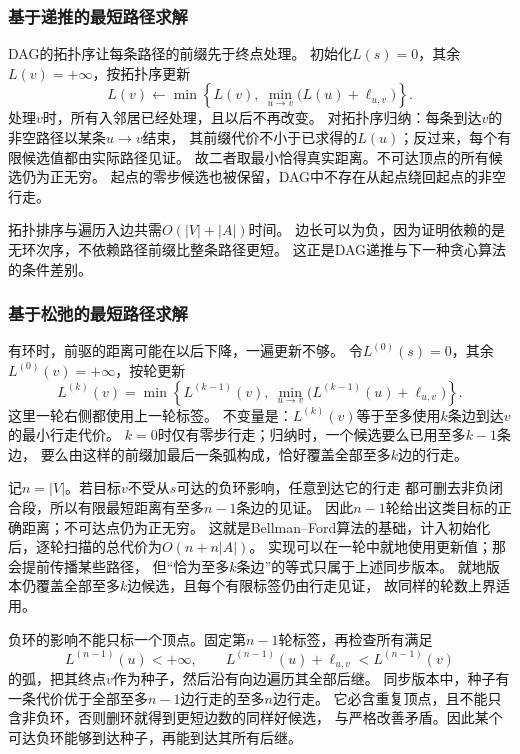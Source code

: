 \subsubsection{基于递推的最短路径求解}

DAG的拓扑序让每条路径的前缀先于终点处理。
初始化\(L(s)=0\)，其余\(L(v)=+\infty\)，按拓扑序更新
\[
  L(v)\leftarrow
  \min\left\{L(v),\ \min_{u\to v}\bigl(L(u)+\ell_{u,v}\bigr)\right\}.
\]
处理\(v\)时，所有入邻居已经处理，且以后不再改变。
对拓扑序归纳：每条到达\(v\)的非空路径以某条\(u\to v\)结束，
其前缀代价不小于已求得的\(L(u)\)；反过来，每个有限候选值都由实际路径见证。
故二者取最小恰得真实距离。不可达顶点的所有候选仍为正无穷。
起点的零步候选也被保留，DAG中不存在从起点绕回起点的非空行走。

拓扑排序与遍历入边共需\(O(|V|+|A|)\)时间。
边长可以为负，因为证明依赖的是无环次序，不依赖路径前缀比整条路径更短。
这正是DAG递推与下一种贪心算法的条件差别。

\subsubsection{基于松弛的最短路径求解}

有环时，前驱的距离可能在以后下降，一遍更新不够。
令\(L^{(0)}(s)=0\)，其余\(L^{(0)}(v)=+\infty\)，按轮更新
\[
  L^{(k)}(v)=
  \min\left\{
    L^{(k-1)}(v),\
    \min_{u\to v}\bigl(L^{(k-1)}(u)+\ell_{u,v}\bigr)
  \right\}.
\]
这里一轮右侧都使用上一轮标签。
不变量是：\(L^{(k)}(v)\)等于至多使用\(k\)条边到达\(v\)的最小行走代价。
\(k=0\)时仅有零步行走；归纳时，一个候选要么已用至多\(k-1\)条边，
要么由这样的前缀加最后一条弧构成，恰好覆盖全部至多\(k\)边的行走。

记\(n=|V|\)。若目标\(v\)不受从\(s\)可达的负环影响，任意到达它的行走
都可删去非负闭合段，所以有限最短距离有至多\(n-1\)条边的见证。
因此\(n-1\)轮给出这类目标的正确距离；不可达点仍为正无穷。
这就是Bellman--Ford算法的基础，计入初始化后，逐轮扫描的总代价为\(O(n+n|A|)\)。
实现可以在一轮中就地使用更新值；那会提前传播某些路径，
但“恰为至多\(k\)条边”的等式只属于上述同步版本。
就地版本仍覆盖全部至多\(k\)边候选，且每个有限标签仍由行走见证，
故同样的轮数上界适用。

负环的影响不能只标一个顶点。固定第\(n-1\)轮标签，再检查所有满足
\[
  L^{(n-1)}(u)<+\infty,\qquad
  L^{(n-1)}(u)+\ell_{u,v}<L^{(n-1)}(v)
\]
的弧，把其终点\(v\)作为种子，然后沿有向边遍历其全部后继。
同步版本中，种子有一条代价优于全部至多\(n-1\)边行走的至多\(n\)边行走。
它必含重复顶点，且不能只含非负环，否则删环就得到更短边数的同样好候选，
与严格改善矛盾。因此某个可达负环能够到达种子，再能到达其所有后继。

